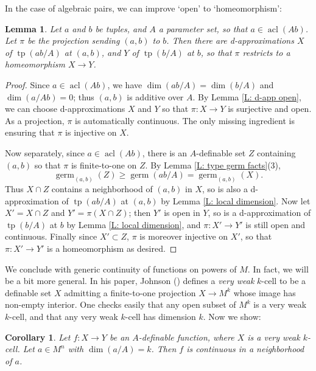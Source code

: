 \documentclass{amsart}
\newtheorem{lemma}[theorem]{Lemma}
\newtheorem{corollary}[theorem]{Corollary}
\theoremstyle{definition}
\newcommand{\acl}{\operatorname{acl}}
\newcommand{\tp}{\operatorname{tp}}
\begin{document}
In the case of algebraic pairs, we can improve `open' to `homeomorphism':

\begin{lemma}\label{L: d-app homeo}
    Let $a$ and $b$ be tuples, and $A$ a parameter set, so that $a\in\acl(Ab)$. Let $\pi$ be the projection sending $(a,b)$ to $b$. Then there are d-approximations $X$ of $\tp(ab/A)$ at $(a,b)$, and $Y$ of $\tp(b/A)$ at $b$, so that $\pi$ restricts to a homeomorphism $X\rightarrow Y$. 
\end{lemma}

\begin{proof}
    Since $a\in\acl(Ab)$, we have $\dim(ab/A)=\dim(b/A)$ and $\dim(a/Ab)=0$; thus $(a,b)$ is additive over $A$. By Lemma \ref{L: d-app open}, we can choose d-approximations $X$ and $Y$ so that $\pi:X\rightarrow Y$ is surjective and open. As a projection, $\pi$ is automatically continuous. The only missing ingredient is ensuring that $\pi$ is injective on $X$.

    Now separately, since $a\in\acl(Ab)$, there is an $A$-definable set $Z$ containing $(a,b)$ so that $\pi$ is finite-to-one on $Z$. By Lemma \ref{L: type germ facts}(3), $$\operatorname{germ}_{(a,b)}(Z)\geq\operatorname{germ}(ab/A)=\operatorname{germ}_{(a,b)}(X).$$ Thus $X\cap Z$ contains a neighborhood of $(a,b)$ in $X$, so is also a d-approximation of $\tp(ab/A)$ at $(a,b)
    $ by Lemma \ref{L: local dimension}. Now let $X'=X\cap Z$ and $Y'=\pi(X\cap Z)$; then $Y'$ is open in $Y$, so is a d-approximation of $\tp(b/A)$ at $b$ by Lemma \ref{L: local dimension}, and $\pi:X'\rightarrow Y'$ is still open and continuous. Finally since $X'\subset Z$, $\pi$ is moreover injective on $X'$, so that $\pi:X'\rightarrow Y'$ is a homeomorphism as desired.
\end{proof}

We conclude with generic continuity of functions on powers of $M$. In fact, we will be a bit more general. In his paper, Johnson (\cite[Definition 2.47]{t-minimal-johnson}) defines a \textit{very weak} $k$-cell to be a definable set $X$ admitting a finite-to-one projection $X\rightarrow M^k$ whose image has non-empty interior. One checks easily that any open subset of $M^k$ is a very weak $k$-cell, and that any very weak $k$-cell has dimension $k$. Now we show:

\begin{corollary}\label{C: generic continuity}
    Let $f:X\rightarrow Y$ be an $A$-definable function, where $X$ is a very weak $k$-cell. Let $a\in M^n$ with $\dim(a/A)=k$. Then $f$ is continuous in a neighborhood of $a$.
    \end{corollary}
\end{document}

